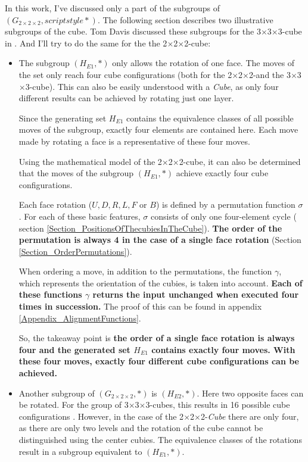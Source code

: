 \documentclass[12pt,a4paper]{article}
\theoremstyle{custom}
\newcommand{\Gtwo}{\ensuremath{G_{2\times 2\times 2}}}
\newcommand{\Ttwo}{2$\times$2$\times$2-}
\newcommand{\Tthree}{3$\times$3$\times$3-}
\begin{document}
In this work, I've discussed only a part of the subgroups of $(\Gtwo, scriptstyle*)$.
The following section describes two illustrative subgroups of the cube. Tom Davis discussed these subgroups for the \Tthree cube in \cite{TD}. And I'll try to do the same for the the \Ttwo cube:
\begin{itemize}
\item The subgroup $\left(H_{E1}, \scriptstyle*\right)$ only allows the rotation of one face. The moves of the set only reach four cube configurations (both for the \Ttwo and the \Tthree cube). This can also be easily understood with a \textit{Cube}, as only four different results can be achieved by rotating just one layer.

Since the generating set $H_{E1}$ contains the equivalence classes of all possible moves of the subgroup, exactly four elements are contained here. Each move made by rotating a face is a representative of these four moves.

Using the mathematical model of the \Ttwo cube, it can also be determined that the moves of the subgroup $(H_{E1}, \scriptstyle*)$ achieve exactly four cube configurations.

Each face rotation ($U, D, R, L, F$ or $B$) is defined by a permutation function $\sigma$. For each of these basic features, $\sigma$ consists of only one four-element cycle ( section \ref{Section_PositionsOfThecubiesInTheCube}). \textbf{The order of the permutation is always 4 in the case of a single face rotation} (Section \ref{Section_OrderPermutations}).

When ordering a move, in addition to the permutations, the function $\gamma$, which represents the orientation of the cubies, is taken into account. \textbf{Each of these functions $\gamma$ returns the input unchanged when executed four times in succession.} The proof of this can be found in appendix \ref{Appendix_AlignmentFunctions}.

So, the takeaway point is  \textbf{the order of a single face rotation is always four and the generated set $H_{E1}$ contains exactly four moves. With these four moves, exactly four different cube configurations can be achieved.}



\item Another subgroup of $\left(\Gtwo, \scriptstyle*\right)$ is $(H_{E2}, \scriptstyle*)$. Here two opposite faces can be rotated.
For the group of \Tthree cubes, this results in 16 possible cube configurations \cite{TD}. However, in the case of the \Ttwo \textit{Cube} there are only four, as there are only two levels and the rotation of the cube cannot be distinguished using the center cubies. The equivalence classes of the rotations result in a subgroup equivalent to $\left(H_{E1}, \scriptstyle*\right)$.
\end{itemize}
\end{document}
